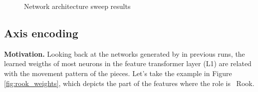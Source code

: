 \begin{figure}[H]
\centering
{}
\caption{Network architecture sweep results}
\label{fig:asdasdasd}
\end{figure}



\newpage
\subsection{Axis encoding} %
\label{sec:axis_encoding}

\newcommand{\axisarrows}[1]{\parbox{0.7cm}{\texttt{[image: ../assets/arrows/\#1.pdf]}}}
\newcommand{\axisarrowsSM}[1]{\parbox{0.6cm}{\texttt{[image: ../assets/arrows/\#1.pdf]}}}

\textbf{Motivation.} Looking back at the networks generated by  in previous runs, the learned weigths of most neurons in the feature transformer layer (L1) are related with the movement pattern of the pieces. Let's take the example in Figure \ref{fig:rook_weights}, which depicts the  part of the features where the role is \symrook\ Rook.

